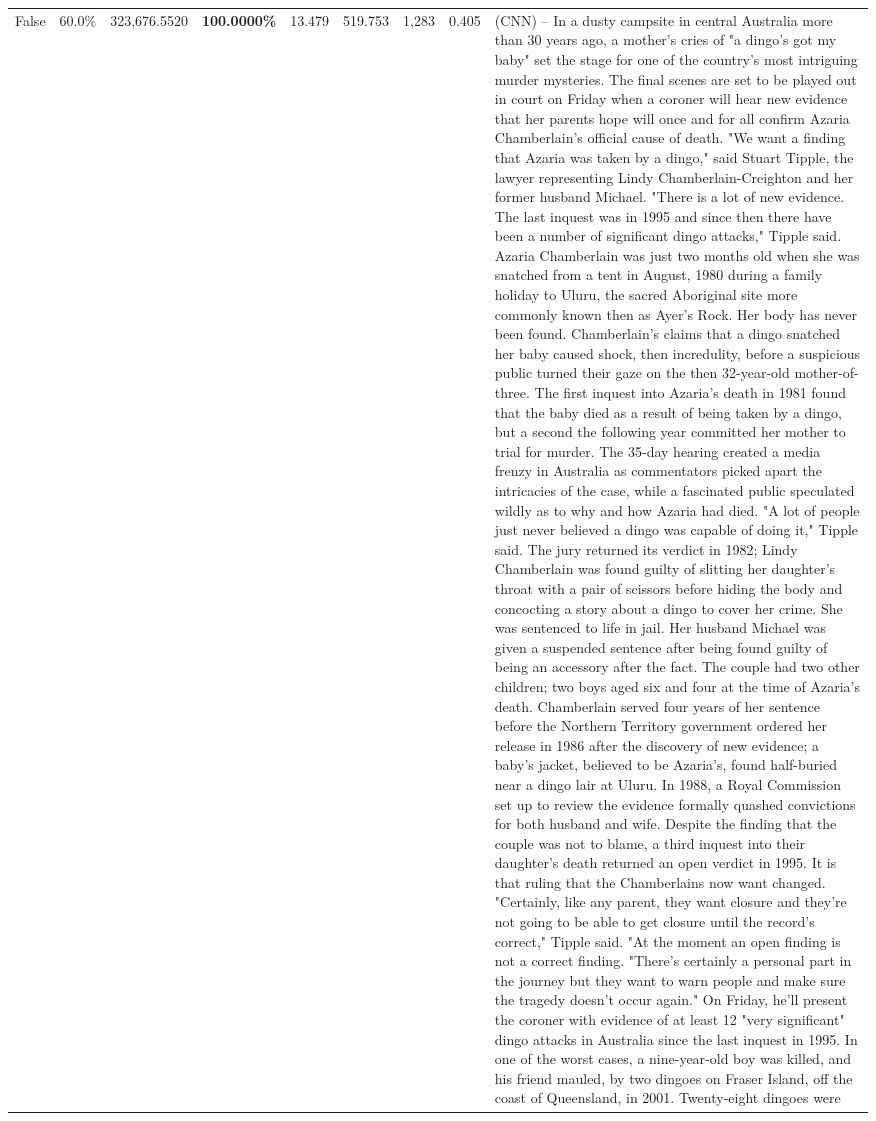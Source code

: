 \begin{table}[H]
\begin{tabular}{lllrlllll}
False & 60.0\% & 323,676.5520 & \bfseries \color{red} 100.0000\% & 13.479 & 519.753 & 1,283 & 0.405 & (CNN) -- In a dusty campsite in central Australia more than 30 years ago, a mother's cries of "a dingo's got my baby" set the stage for one of the country's most intriguing murder mysteries. The final scenes are set to be played out in court on Friday when a coroner will hear new evidence that her parents hope will once and for all confirm Azaria Chamberlain's official cause of death. "We want a finding that Azaria was taken by a dingo," said Stuart Tipple, the lawyer representing Lindy Chamberlain-Creighton and her former husband Michael. "There is a lot of new evidence. The last inquest was in 1995 and since then there have been a number of significant dingo attacks," Tipple said. Azaria Chamberlain was just two months old when she was snatched from a tent in August, 1980 during a family holiday to Uluru, the sacred Aboriginal site more commonly known then as Ayer's Rock. Her body has never been found. Chamberlain's claims that a dingo snatched her baby caused shock, then incredulity, before a suspicious public turned their gaze on the then 32-year-old mother-of-three. The first inquest into Azaria's death in 1981 found that the baby died as a result of being taken by a dingo, but a second the following year committed her mother to trial for murder. The 35-day hearing created a media frenzy in Australia as commentators picked apart the intricacies of the case, while a fascinated public speculated wildly as to why and how Azaria had died. "A lot of people just never believed a dingo was capable of doing it," Tipple said. The jury returned its verdict in 1982; Lindy Chamberlain was found guilty of slitting her daughter's throat with a pair of scissors before hiding the body and concocting a story about a dingo to cover her crime. She was sentenced to life in jail. Her husband Michael was given a suspended sentence after being found guilty of being an accessory after the fact. The couple had two other children; two boys aged six and four at the time of Azaria's death. Chamberlain served four years of her sentence before the Northern Territory government ordered her release in 1986 after the discovery of new evidence; a baby's jacket, believed to be Azaria's, found half-buried near a dingo lair at Uluru. In 1988, a Royal Commission set up to review the evidence formally quashed convictions for both husband and wife. Despite the finding that the couple was not to blame, a third inquest into their daughter's death returned an open verdict in 1995. It is that ruling that the Chamberlains now want changed. "Certainly, like any parent, they want closure and they're not going to be able to get closure until the record's correct," Tipple said. "At the moment an open finding is not a correct finding. "There's certainly a personal part in the journey but they want to warn people and make sure the tragedy doesn't occur again." On Friday, he'll present the coroner with evidence of at least 12 "very significant" dingo attacks in Australia since the last inquest in 1995. In one of the worst cases, a nine-year-old boy was killed, and his friend mauled, by two dingoes on Fraser Island, off the coast of Queensland, in 2001. Twenty-eight dingoes were 
\end{tabular}
\end{table}
